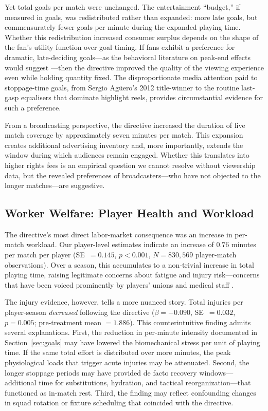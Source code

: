 Yet total goals per match were unchanged. The entertainment ``budget,'' if
measured in goals, was redistributed rather than expanded: more late goals,
but commensurately fewer goals per minute during the expanded playing
time. Whether this redistribution increased consumer surplus depends on
the shape of the fan's utility function over goal timing. If fans exhibit
a preference for dramatic, late-deciding goals---as the behavioral
literature on peak-end effects would suggest \citep{Kahneman1993}---then
the directive improved the quality of the viewing experience even while
holding quantity fixed. The disproportionate media attention paid to
stoppage-time goals, from Sergio Agüero's 2012 title-winner to the
routine last-gasp equalisers that dominate highlight reels, provides
circumstantial evidence for such a preference.

From a broadcasting perspective, the directive increased the duration of
live match coverage by approximately seven minutes per match. This
expansion creates additional advertising inventory and, more importantly,
extends the window during which audiences remain engaged. Whether this
translates into higher rights fees is an empirical question we cannot
resolve without viewership data, but the revealed preferences of
broadcasters---who have not objected to the longer matches---are
suggestive.

\subsection{Worker Welfare: Player Health and Workload}\label{subsec:worker}

The directive's most direct labor-market consequence was an increase in
per-match workload. Our player-level estimates indicate an increase of
$0.76$ minutes per match per player (SE~$= 0.145$, $p < 0.001$,
$N = 830{,}569$ player-match observations). Over a season, this
accumulates to a non-trivial increase in total playing time, raising
legitimate concerns about fatigue and injury risk---concerns that have
been voiced prominently by players' unions and medical staff
\citep{Ekstrand2023}.

The injury evidence, however, tells a more nuanced story. Total injuries
per player-season \emph{decreased} following the directive ($\beta =
-0.090$, SE~$= 0.032$, $p = 0.005$; pre-treatment mean $= 1.886$). This
counterintuitive finding admits several explanations. First, the
reduction in per-minute intensity documented in Section~\ref{sec:goals}
may have lowered the biomechanical stress per unit of playing time. If
the same total effort is distributed over more minutes, the peak
physiological loads that trigger acute injuries may be attenuated.
Second, the longer stoppage periods may have provided de facto recovery
windows---additional time for substitutions, hydration, and tactical
reorganization---that functioned as in-match rest. Third, the finding may
reflect confounding changes in squad rotation or fixture scheduling that
coincided with the directive.

